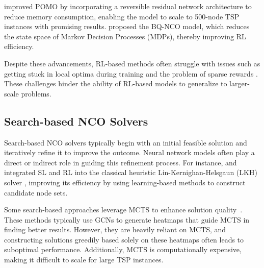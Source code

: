 \citet{jin2023pointerformer} improved POMO by incorporating a reversible residual network architecture to reduce memory consumption, enabling the model to scale to 500-node TSP instances with promising results. 
\citet{drakulic2024bq} proposed the BQ-NCO model, which reduces the state space of Markov Decision Processes (MDPs), thereby  improving RL efficiency. 

Despite these advancements, RL-based methods often struggle with issues such as getting stuck in local optima during training and the problem of sparse rewards \cite{bengio2021machine, min2024unsupervised}.
These challenges  hinder the ability of RL-based models to generalize to larger-scale problems. 

\subsection{Search-based NCO Solvers}
Search-based NCO solvers typically begin with an initial feasible solution and iteratively refine it to improve the outcome. Neural network models often play a direct or indirect role in guiding this refinement process. 
For instance, \citet{xin2021neurolkh} and \citet{zheng2023reinforced} integrated SL and RL into the classical heuristic Lin-Kernighan-Helsgaun (LKH) solver \cite{helsgaun2000effective,helsgaun2009general,helsgaun2017extension}, improving its efficiency by using learning-based methods to construct candidate node sets. 

Some search-based approaches leverage MCTS to enhance solution quality~\cite{fu2021generalize,qiu2022dimes,sun2023difusco,xia2024position}. These methods typically use GCNs to generate heatmaps that guide MCTS in finding better results. However, they are heavily reliant on MCTS, and constructing solutions greedily based solely on these heatmaps often leads to suboptimal performance. 
Additionally, MCTS is computationally expensive, making it difficult to scale for large TSP instances. 

